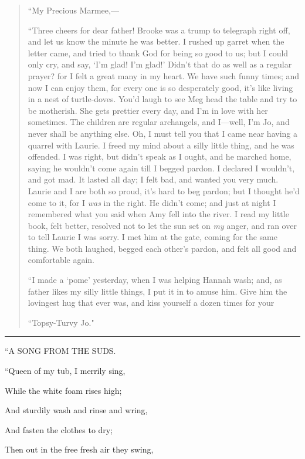 \begin{quote}
``My Precious Marmee,---

``Three cheers for dear father! Brooke was a trump to telegraph right
off, and let us know the minute he was better. I rushed up garret when
the letter came, and tried to thank God for being so good to us; but I
could only cry, and say, `I'm glad!
I'm glad!' Didn't that
do as well as a regular prayer? for I felt a great many in my heart. We
have such funny times; and now I can enjoy them, for every one is so
desperately good, it's like living in a nest of
turtle-doves. You'd laugh to see Meg head the table and
try to be motherish. She gets prettier every day, and
I'm in love with her sometimes. The children are regular
archangels, and I---well, I'm Jo, and never shall be
anything else. Oh, I must tell you that I came near having a quarrel
with Laurie. I freed my mind about a silly little thing, and he was
offended. I was right, but didn't speak as I ought, and
he marched home, saying he wouldn't come again till I
begged pardon. I declared I wouldn't, and got mad. It
lasted all day; I felt bad, and wanted you very much. Laurie and I are
both so proud, it's hard to beg pardon; but I thought
he'd come to it, for I \emph{was} in the right. He
didn't come; and just at night I remembered what you
said when Amy fell into the river. I read my little book, felt better,
resolved not to let the sun set on \emph{my} anger, and ran over to tell
Laurie I was sorry. I met him at the gate, coming for the same thing. We
both laughed, begged each other's pardon, and felt all
good and comfortable again.

``I made a `pome' yesterday, when I was
helping Hannah wash; and, as father likes my silly little things, I put
it in to amuse him. Give him the lovingest hug that ever was, and kiss
yourself a dozen times for your

``Topsy-Turvy Jo."
\end{quote}

\begin{center}\rule{0.5\linewidth}{0.5pt}\end{center}

``A SONG FROM THE SUDS.

``Queen of my tub, I merrily sing,

While the white foam rises high;

And sturdily wash and rinse and wring,

And fasten the clothes to dry;

Then out in the free fresh air they swing,

